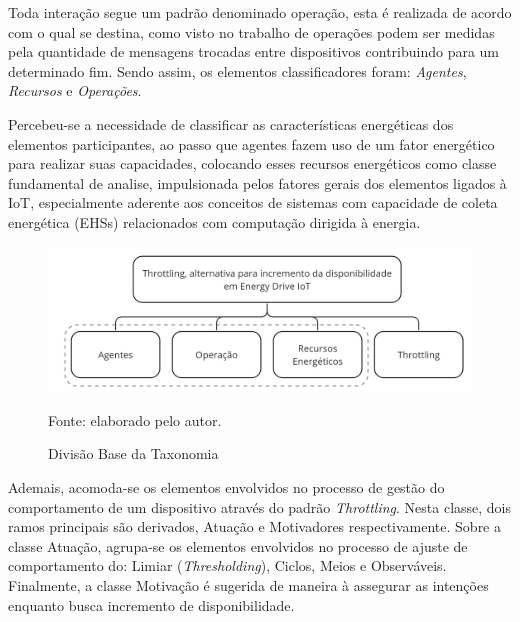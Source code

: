 Toda interação segue um padrão denominado operação, esta é realizada de acordo com o qual se destina, como visto no trabalho de \cite{khairnar_discrete-rate_2015} operações podem ser medidas pela quantidade de mensagens trocadas entre dispositivos contribuindo para um determinado fim. Sendo assim, os elementos classificadores foram: \textit{Agentes}, \textit{Recursos} e \textit{Operações}.

Percebeu-se a necessidade de classificar as características energéticas dos elementos participantes, ao passo que agentes fazem uso de um fator energético para realizar suas capacidades, colocando esses recursos energéticos como classe fundamental de analise, impulsionada pelos fatores gerais dos elementos ligados à \acs{IoT}, especialmente aderente aos conceitos de sistemas com  capacidade de coleta energética (\aclp{EHS}) relacionados com computação dirigida à energia.


\begin{figure}[hbt]
	\centering
	\caption{Divisão Base da Taxonomia}
	\label{fig:divisaobasetaxonomia}
	\includegraphics[width=0.7\linewidth]{Imagens/cap4/cap4taxonomia_primeironivel.jpg}	
	
	Fonte: elaborado pelo autor.
\end{figure}

Ademais, acomoda-se os elementos envolvidos no processo de gestão do comportamento de um dispositivo através do padrão \textit{Throttling}. Nesta classe, dois ramos principais são derivados, Atuação e Motivadores respectivamente. Sobre a classe Atuação, agrupa-se os elementos envolvidos no processo de ajuste de comportamento do: Limiar (\textit{Thresholding}), Ciclos, Meios e Observáveis. Finalmente, a classe Motivação é sugerida de maneira à assegurar as intenções enquanto busca incremento de disponibilidade. 


